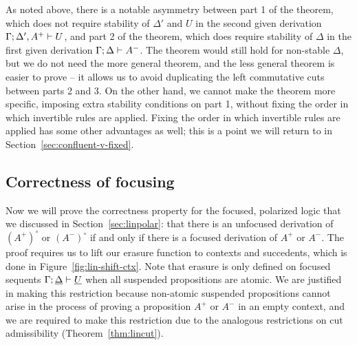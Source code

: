 

As noted above, there is a notable asymmetry between part 1 of the
theorem, which does not require stability of $\Delta'$ and $U$ in the
second given derivation ${\Gamma};{\Delta',A^+} \vdash {U} \mathstrut$, and part 2
of the theorem, which does require stability of $\Delta$ in the first
given derivation ${\Gamma};{\Delta} \vdash {A^-} \mathstrut$. The theorem would
still hold for non-stable $\Delta$, but we do not need the more
general theorem, and the less general theorem is easier to prove -- it
allows us to avoid duplicating the left commutative cuts between parts
2 and 3. On the other hand, we cannot make the theorem more specific,
imposing extra stability conditions on part 1, without fixing the
order in which invertible rules are applied. Fixing the order in which
invertible rules are applied has some other advantages as well; this
is a point we will return to in Section~\ref{sec:confluent-v-fixed}.

\subsection{Correctness of focusing}
\label{sec:lincorrectness}



Now we will prove the correctness property for the focused, polarized
logic that we discussed in Section~\ref{sec:linpolar}: that there is
an unfocused derivation of $(A^+)^\circ$ or $(A^-)^\circ$ if and only
if there is a focused derivation of $A^+$ or $A^-$.  The proof
requires us to lift our erasure function to contexts and succedents,
which is done in Figure~\ref{fig:lin-shift-ctx}. Note that erasure is
only defined on focused sequents
${\Gamma};{\underline{\Delta}} \vdash {\underline{U}} \mathstrut$ when all
suspended propositions are atomic. We are justified in making this
restriction because non-atomic suspended propositions cannot arise in
the process of proving a proposition $A^+$ or $A^-$ in an empty
context, and we are required to make this restriction due to the
analogous restrictions on cut admissibility
(Theorem~\ref{thm:lincut}).

